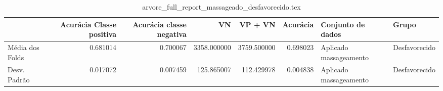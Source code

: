 \begin{table}
\centering
\caption{arvore_full_report_massageado_desfavorecido.tex}
\label{arvore_full_report_massageado_desfavorecido.tex}
\begin{tabular}{lrrrrrll}
\toprule
{}              &  Acurácia Classe positiva &  Acurácia classe negativa &          VN  &     VP + VN  &  Acurácia &       Conjunto de dados &          Grupo \\
\midrule
Média dos Folds &                  0.681014 &                  0.700067 &  3358.000000 &  3759.500000 &  0.698023 &  Aplicado massageamento &  Desfavorecido \\
Desv. Padrão    &                  0.017072 &                  0.007459 &   125.865007 &   112.429978 &  0.004838 &  Aplicado massageamento &  Desfavorecido \\
\bottomrule
\end{tabular}
\end{table}
